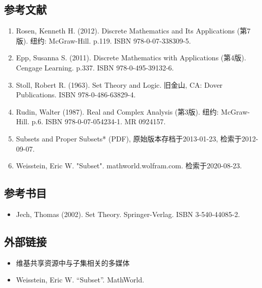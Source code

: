 \subsection{参考文献}
\begin{enumerate}
\item Rosen, Kenneth H. (2012). Discrete Mathematics and Its Applications (第7版). 纽约: McGraw-Hill. p.119. ISBN 978-0-07-338309-5.
\item Epp, Susanna S. (2011). Discrete Mathematics with Applications (第4版). Cengage Learning. p.337. ISBN 978-0-495-39132-6.
\item Stoll, Robert R. (1963). Set Theory and Logic. 旧金山, CA: Dover Publications. ISBN 978-0-486-63829-4.
\item Rudin, Walter (1987). Real and Complex Analysis (第3版). 纽约: McGraw-Hill. p.6. ISBN 978-0-07-054234-1. MR 0924157.
\item Subsets and Proper Subsets* (PDF), 原始版本存档于2013-01-23, 检索于2012-09-07.
\item Weisstein, Eric W. "Subset". mathworld.wolfram.com. 检索于2020-08-23.
\end{enumerate}
\subsection{参考书目}
\begin{itemize}
\item Jech, Thomas (2002). Set Theory. Springer-Verlag. ISBN 3-540-44085-2.
\end{itemize}
\subsection{外部链接}
\begin{itemize}
\item 维基共享资源中与子集相关的多媒体
\item Weisstein, Eric W. “Subset”. MathWorld.
\end{itemize}

